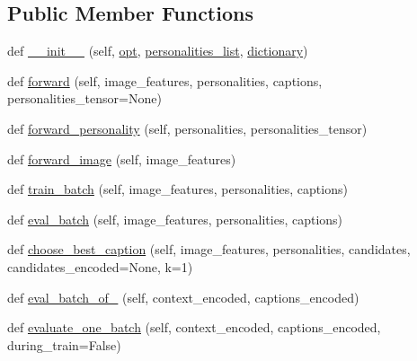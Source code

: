 \subsection*{Public Member Functions}
\begin{DoxyCompactItemize}
\item 
def \hyperlink{classtransresnet_1_1modules_1_1TransresnetModel_ab2645d81cc43af74c22941da848a4102}{\+\_\+\+\_\+init\+\_\+\+\_\+} (self, \hyperlink{classtransresnet_1_1modules_1_1TransresnetModel_a21d64d399d42b5d8f275b93a7ef3f5db}{opt}, \hyperlink{classtransresnet_1_1modules_1_1TransresnetModel_a39b68fff51a01dd00581b553ee37eb50}{personalities\+\_\+list}, \hyperlink{classtransresnet_1_1modules_1_1TransresnetModel_a9755441a27672c7126eea150daaee0c1}{dictionary})
\item 
def \hyperlink{classtransresnet_1_1modules_1_1TransresnetModel_a371736aee24f40d0841a74aeb01f9145}{forward} (self, image\+\_\+features, personalities, captions, personalities\+\_\+tensor=None)
\item 
def \hyperlink{classtransresnet_1_1modules_1_1TransresnetModel_aa3f65819701999860b414e1bb6bf74cb}{forward\+\_\+personality} (self, personalities, personalities\+\_\+tensor)
\item 
def \hyperlink{classtransresnet_1_1modules_1_1TransresnetModel_a578be5b044ee4d34d48541fdeb3ee947}{forward\+\_\+image} (self, image\+\_\+features)
\item 
def \hyperlink{classtransresnet_1_1modules_1_1TransresnetModel_aedf5402061ce43a2b594eb9c8a374738}{train\+\_\+batch} (self, image\+\_\+features, personalities, captions)
\item 
def \hyperlink{classtransresnet_1_1modules_1_1TransresnetModel_ad41dbceaf0c86aac1b29e68fea3c4f14}{eval\+\_\+batch} (self, image\+\_\+features, personalities, captions)
\item 
def \hyperlink{classtransresnet_1_1modules_1_1TransresnetModel_a9db8fd3e6b80ef4f17a9975673e46d01}{choose\+\_\+best\+\_\+caption} (self, image\+\_\+features, personalities, candidates, candidates\+\_\+encoded=None, k=1)
\item 
def \hyperlink{classtransresnet_1_1modules_1_1TransresnetModel_a1cd91f1cd051b1545683b465f7a74e12}{eval\+\_\+batch\+\_\+of\+\_} (self, context\+\_\+encoded, captions\+\_\+encoded)
\item 
def \hyperlink{classtransresnet_1_1modules_1_1TransresnetModel_a2cce905d8e06109ae23cf4910386526d}{evaluate\+\_\+one\+\_\+batch} (self, context\+\_\+encoded, captions\+\_\+encoded, during\+\_\+train=False)

\end{DoxyCompactItemize}
